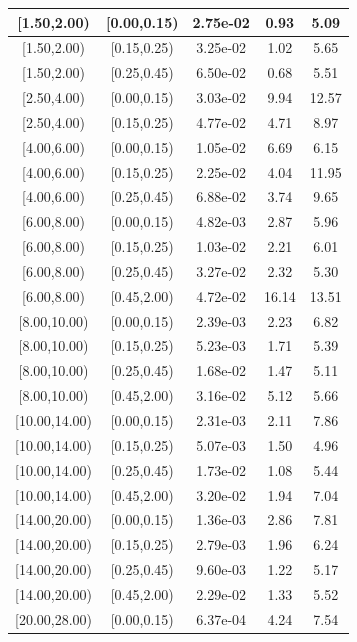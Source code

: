 \documentclass[%
aps, prd, reprint, show pacs, preprint numbers, ams math, amssymb, superscriptaddress, linenumbers]{revtex4-1}
\begin{document}
\begin{table}
\begin{tabular}{|c|c|c|c|c|}
 \hline
[1.50,2.00) & [0.00,0.15) & 2.75e-02 & 0.93 & 5.09 \\ 
 \hline
[1.50,2.00) & [0.15,0.25) & 3.25e-02 & 1.02 & 5.65 \\ 
 \hline
[1.50,2.00) & [0.25,0.45) & 6.50e-02 & 0.68 & 5.51 \\ 
 \hline
[2.50,4.00) & [0.00,0.15) & 3.03e-02 & 9.94 & 12.57 \\ 
 \hline
[2.50,4.00) & [0.15,0.25) & 4.77e-02 & 4.71 & 8.97 \\ 
 \hline
[4.00,6.00) & [0.00,0.15) & 1.05e-02 & 6.69 & 6.15 \\ 
 \hline
[4.00,6.00) & [0.15,0.25) & 2.25e-02 & 4.04 & 11.95 \\ 
 \hline
[4.00,6.00) & [0.25,0.45) & 6.88e-02 & 3.74 & 9.65 \\ 
 \hline
[6.00,8.00) & [0.00,0.15) & 4.82e-03 & 2.87 & 5.96 \\ 
 \hline
[6.00,8.00) & [0.15,0.25) & 1.03e-02 & 2.21 & 6.01 \\ 
 \hline
[6.00,8.00) & [0.25,0.45) & 3.27e-02 & 2.32 & 5.30 \\ 
 \hline
[6.00,8.00) & [0.45,2.00) & 4.72e-02 & 16.14 & 13.51 \\ 
 \hline
[8.00,10.00) & [0.00,0.15) & 2.39e-03 & 2.23 & 6.82 \\ 
 \hline
[8.00,10.00) & [0.15,0.25) & 5.23e-03 & 1.71 & 5.39 \\ 
 \hline
[8.00,10.00) & [0.25,0.45) & 1.68e-02 & 1.47 & 5.11 \\ 
 \hline
[8.00,10.00) & [0.45,2.00) & 3.16e-02 & 5.12 & 5.66 \\ 
 \hline
[10.00,14.00) & [0.00,0.15) & 2.31e-03 & 2.11 & 7.86 \\ 
 \hline
[10.00,14.00) & [0.15,0.25) & 5.07e-03 & 1.50 & 4.96 \\ 
 \hline
[10.00,14.00) & [0.25,0.45) & 1.73e-02 & 1.08 & 5.44 \\ 
 \hline
[10.00,14.00) & [0.45,2.00) & 3.20e-02 & 1.94 & 7.04 \\ 
 \hline
[14.00,20.00) & [0.00,0.15) & 1.36e-03 & 2.86 & 7.81 \\ 
 \hline
[14.00,20.00) & [0.15,0.25) & 2.79e-03 & 1.96 & 6.24 \\ 
 \hline
[14.00,20.00) & [0.25,0.45) & 9.60e-03 & 1.22 & 5.17 \\ 
 \hline
[14.00,20.00) & [0.45,2.00) & 2.29e-02 & 1.33 & 5.52 \\ 
 \hline
[20.00,28.00) & [0.00,0.15) & 6.37e-04 & 4.24 & 7.54 \\ 

\end{tabular}
\end{table}
\end{document}
